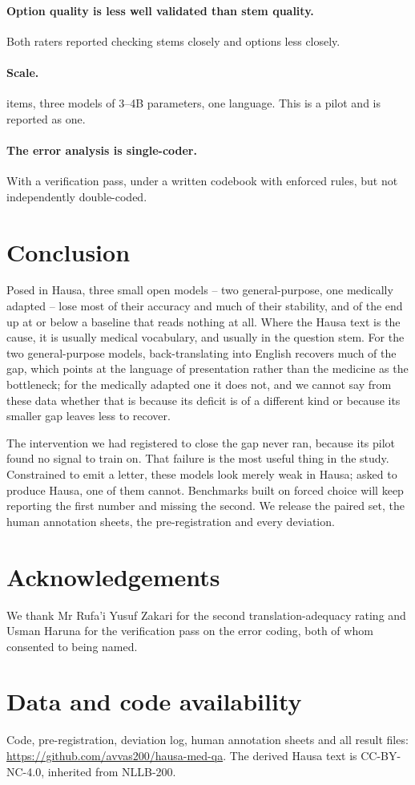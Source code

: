 \documentclass[11pt,a4paper]{article}
\begin{document}
\paragraph{Option quality is less well validated than stem quality.}
Both raters reported checking stems closely and options less closely.

\paragraph{Scale.}
\NEval{} items, three models of 3--4B parameters, one language. This is a pilot
and is reported as one.

\paragraph{The error analysis is single-coder.}
With a verification pass, under a written codebook with enforced rules, but not
independently double-coded.

\section{Conclusion}

Posed in Hausa, three small open models -- two general-purpose, one medically
adapted -- lose most of their accuracy and much of their stability, and
\NBelowBaseline{} of the \NModels{} end up at or below a baseline that reads
nothing at all. Where the Hausa text is the cause, it is usually medical
vocabulary, and usually in the question stem. For the two general-purpose
models, back-translating into English recovers much of the gap, which points at
the language of presentation rather than the medicine as the bottleneck; for the
medically adapted one it does not, and we cannot say from these data whether
that is because its deficit is of a different kind or because its smaller gap
leaves less to recover.

The intervention we had registered to close the gap never ran, because its
pilot found no signal to train on. That failure is the most useful thing in the
study. Constrained to emit a letter, these models look merely weak in Hausa;
asked to produce Hausa, one of them cannot. Benchmarks built on forced choice
will keep reporting the first number and missing the second. We release the
paired set, the human annotation sheets, the pre-registration and every
deviation.

\section*{Acknowledgements}
We thank Mr Rufa'i Yusuf Zakari for the second translation-adequacy rating and
Usman Haruna for the verification pass on the error coding, both of whom consented to being named.

\section*{Data and code availability}
Code, pre-registration, deviation log, human annotation sheets and all result
files: \url{https://github.com/avvas200/hausa-med-qa}. The derived Hausa text is
CC-BY-NC-4.0, inherited from NLLB-200.



\end{document}
